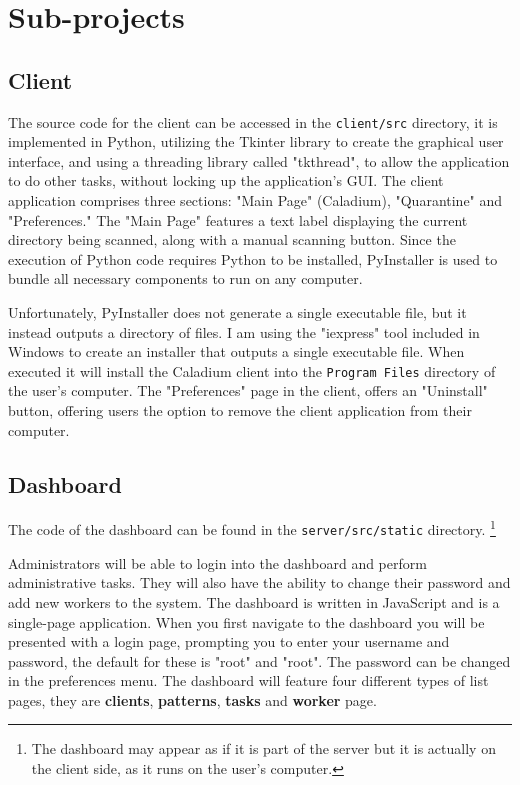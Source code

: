 \section{Sub-projects}
\subsection{Client}
The source code for the client can be accessed in
the \texttt{client/src} directory, it is implemented in Python,
utilizing the Tkinter library to create the graphical user interface,
and using a threading library called "tkthread",
to allow the application to do other tasks,
without locking up the application's GUI.
The client application comprises three sections:
"Main Page" (Caladium), "Quarantine" and "Preferences."
The "Main Page" features a text label displaying
the current directory being scanned,
along with a manual scanning button.
Since the execution of Python code requires Python to be installed,
PyInstaller is used to bundle all necessary components to run on any computer.

Unfortunately, PyInstaller does not generate a single executable file,
but it instead outputs a directory of files.
I am using the "iexpress" tool included in Windows to
create an installer that outputs a single executable file.
When executed it will install the Caladium client
into the \texttt{Program Files} directory of the user's computer.
The "Preferences" page in the client, offers an "Uninstall" button,
offering users the option to remove the client application from their computer.

\subsection{Dashboard}
The code of the dashboard can be found in the \texttt{server/src/static} directory.
\footnote{The dashboard may appear as if it is part of the server
but it is actually on the client side, as it runs on the user's computer.}

Administrators will be able to login into the dashboard
and perform administrative tasks.
They will also have the ability to change their
password and add new workers to the system.
The dashboard is written in JavaScript and is a single-page application.
When you first navigate to the dashboard you will be presented with a login page,
prompting you to enter your username and password,
the default for these is "root" and "root".
The password can be changed in the preferences menu.
The dashboard will feature four different types of list pages,
they are \textbf{clients}, \textbf{patterns},
\textbf{tasks} and \textbf{worker} page.

